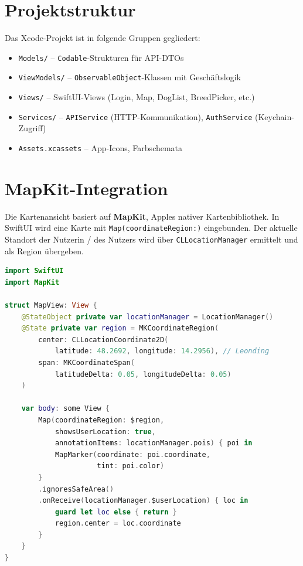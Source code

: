\section{Projektstruktur}
\label{sec:ios-struktur}

Das Xcode-Projekt ist in folgende Gruppen gegliedert:

\begin{itemize}
  \item \texttt{Models/} – \texttt{Codable}-Strukturen für API-DTOs
  \item \texttt{ViewModels/} – \texttt{ObservableObject}-Klassen mit Geschäftslogik
  \item \texttt{Views/} – SwiftUI-Views (Login, Map, DogList, BreedPicker, etc.)
  \item \texttt{Services/} – \texttt{APIService} (HTTP-Kommunikation), \texttt{AuthService}
    (Keychain-Zugriff)
  \item \texttt{Assets.xcassets} – App-Icons, Farbschemata
\end{itemize}

\section{MapKit-Integration}
\label{sec:mapkit}

Die Kartenansicht basiert auf \textbf{MapKit}, Apples nativer Kartenbibliothek. In
SwiftUI wird eine Karte mit \texttt{Map(coordinateRegion:)} eingebunden. Der aktuelle
Standort der Nutzerin / des Nutzers wird über \texttt{CLLocationManager} ermittelt und
als Region übergeben.

\begin{lstlisting}[language=swift, caption={Kartenansicht in SwiftUI (vereinfacht)}, label=lst:mapview, float=htbp]
import SwiftUI
import MapKit

struct MapView: View {
    @StateObject private var locationManager = LocationManager()
    @State private var region = MKCoordinateRegion(
        center: CLLocationCoordinate2D(
            latitude: 48.2692, longitude: 14.2956), // Leonding
        span: MKCoordinateSpan(
            latitudeDelta: 0.05, longitudeDelta: 0.05)
    )

    var body: some View {
        Map(coordinateRegion: $region,
            showsUserLocation: true,
            annotationItems: locationManager.pois) { poi in
            MapMarker(coordinate: poi.coordinate,
                      tint: poi.color)
        }
        .ignoresSafeArea()
        .onReceive(locationManager.$userLocation) { loc in
            guard let loc else { return }
            region.center = loc.coordinate
        }
    }
}
\end{lstlisting}

